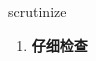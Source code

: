 
\begin{frame}
{\huge scrutinize}
\begin{center}
\begin{enumerate}\Large
  \item \textbf{仔细检查}
\end{enumerate}
\end{center}
\end{frame}
